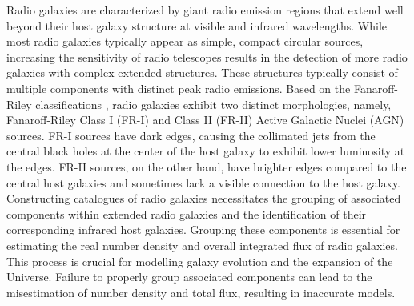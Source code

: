 \documentclass[
  journal=pasa,
  manuscript=research-paper, %
  year=2020,
  volume=37,
]{cup-journal}
\begin{document}
Radio galaxies are characterized by giant radio emission regions that extend well beyond their host galaxy structure at visible and infrared wavelengths. 
While most radio galaxies typically appear as simple, compact circular sources, increasing the sensitivity of radio telescopes results in the detection of more radio galaxies with complex extended structures. 
These structures typically consist of multiple components with distinct peak radio emissions. 
Based on the Fanaroff-Riley classifications \citep{fanaroff74}, radio galaxies exhibit two distinct morphologies, namely, Fanaroff-Riley Class I (FR-I) and Class II (FR-II) Active Galactic Nuclei (AGN) sources. FR-I sources have dark edges, causing the collimated jets from the central black holes at the center of the host galaxy to exhibit lower luminosity at the edges. FR-II sources, on the other hand, have brighter edges compared to the central host galaxies and sometimes lack a visible connection to the host galaxy.
Constructing catalogues of radio galaxies necessitates the grouping of associated components within extended radio galaxies and the identification of their corresponding infrared host galaxies.
Grouping these components is essential for estimating the real number density and overall integrated flux of radio galaxies. This process is crucial for modelling galaxy evolution and the expansion of the Universe. Failure to properly group associated components can lead to the misestimation of number density and total flux, resulting in inaccurate models.
\end{document}
